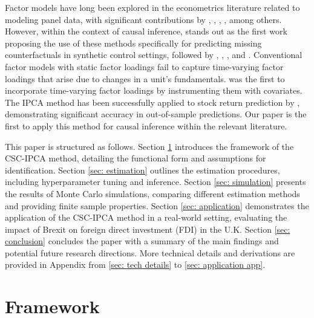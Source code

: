 \documentclass[12pt]{article}
\begin{document}
Factor models have long been explored in the econometrics literature related to modeling panel data, with significant contributions by \cite{bai2003computation}, \cite{pesaran2006estimation}, \cite{stock2002forecasting}, \cite{eberhardt2009cross}, among others. However, within the context of causal inference, \cite{hsiao2012panel} stands out as the first work proposing the use of these methods specifically for predicting missing counterfactuals in synthetic control settings, followed by \cite{gobillon2016regional}, \cite{xu2017generalized}, \cite{chan2016policy}, and \cite{li2018inference}. Conventional factor models with static factor loadings fail to capture time-varying factor loadings that arise due to changes in a unit's fundamentals. \cite{kelly2020instrumented} was the first to incorporate time-varying factor loadings by instrumenting them with covariates. The IPCA method has been successfully applied to stock return prediction by \cite{kelly2019characteristics}, demonstrating significant accuracy in out-of-sample predictions. Our paper is the first to apply this method for causal inference within the relevant literature.

This paper is structured as follows. Section \ref{sec: framework} introduces the framework of the CSC-IPCA method, detailing the functional form and assumptions for identification. Section \ref{sec: estimation} outlines the estimation procedures, including hyperparameter tuning and inference. Section \ref{sec: simulation} presents the results of Monte Carlo simulations, comparing different estimation methods and providing finite sample properties. Section \ref{sec: application} demonstrates the application of the CSC-IPCA method in a real-world setting, evaluating the impact of Brexit on foreign direct investment (FDI) in the U.K. Section \ref{sec: conclusion} concludes the paper with a summary of the main findings and potential future research directions. More technical details and derivations are provided in Appendix from \ref{sec: tech details} to \ref{sec: application app}.

\section{Framework} 
\label{sec: framework}
\end{document}
